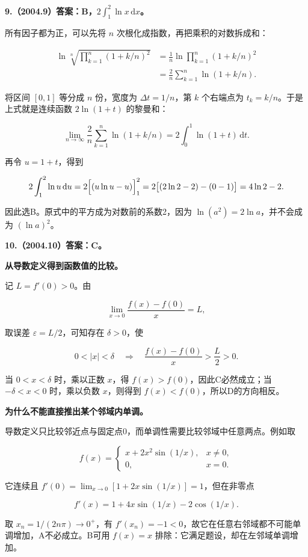 \documentclass[UTF8,11pt,fontset=windows]{ctexart}
\begin{document}
\textbf{9.（2004.9）答案：B，$2\displaystyle\int_1^2\ln x\,\mathrm dx$。}

所有因子都为正，可以先将 $n$ 次根化成指数，再把乘积的对数拆成和：

$$
\begin{aligned}
\ln\sqrt[n]{\prod_{k=1}^n(1+k/n)^2}
 &=\frac1n\ln\prod_{k=1}^n(1+k/n)^2\\
 &=\frac2n\sum_{k=1}^n\ln(1+k/n).
\end{aligned}
$$

将区间 $[0,1]$ 等分成 $n$ 份，宽度为 $\Delta t=1/n$，第 $k$ 个右端点为 $t_k=k/n$。于是上式就是连续函数 $2\ln(1+t)$ 的黎曼和：

$$
\lim_{n\to\infty}\frac2n\sum_{k=1}^n\ln(1+k/n)
=2\int_0^1\ln(1+t)\,\mathrm dt.
$$

再令 $u=1+t$，得到

$$
2\int_1^2\ln u\,\mathrm du
=2\Bigl[(u\ln u-u)\Bigr]_1^2
=2\bigl[(2\ln2-2)-(0-1)\bigr]
=4\ln2-2.
$$

因此选B。原式中的平方成为对数前的系数2，因为 $\ln(a^2)=2\ln a$，并不会成为 $(\ln a)^2$。

\clearpage

\textbf{10.（2004.10）答案：C。}

\textbf{从导数定义得到函数值的比较。}

记 $L=f'(0)>0$。由

$$
\lim_{x\to0}\frac{f(x)-f(0)}x=L,
$$

取误差 $\varepsilon=L/2$，可知存在 $\delta>0$，使

$$
0<|x|<\delta\quad\Longrightarrow\quad
\frac{f(x)-f(0)}x>\frac L2>0.
$$

当 $0<x<\delta$ 时，乘以正数 $x$，得 $f(x)>f(0)$，因此C必然成立；当 $-\delta<x<0$ 时，乘以负数 $x$，则得到 $f(x)<f(0)$，所以D的方向相反。

\textbf{为什么不能直接推出某个邻域内单调。}

导数定义只比较邻近点与固定点0，而单调性需要比较邻域中任意两点。例如取

$$
f(x)=\begin{cases}x+2x^2\sin(1/x),&x\ne0,\\0,&x=0.\end{cases}
$$

它连续且 $f'(0)=\lim_{x\to0}[1+2x\sin(1/x)]=1$，但在非零点

$$
f'(x)=1+4x\sin(1/x)-2\cos(1/x).
$$

取 $x_n=1/(2n\pi)\to0^+$，有 $f'(x_n)=-1<0$，故它在任意右邻域都不可能单调增加，A不必成立。B可用 $f(x)=x$ 排除：它满足题设，却在左邻域单调增加。
\end{document}
